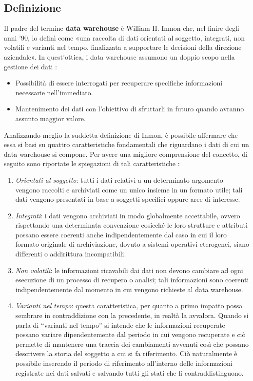 \subsection{Definizione}

Il padre del termine \textbf{data warehouse} è William H. Inmon che, nel finire degli anni '90, lo definì come «una raccolta di dati orientati al soggetto, integrati, non volatili e varianti nel tempo, finalizzata a supportare le decisioni della direzione aziendale». In quest'ottica, i data warehouse assumono un doppio scopo nella gestione dei dati \cite{inmon_building_the_data_warehouse}:

\begin{itemize}
    \item Possibilità di essere interrogati per recuperare specifiche informazioni necessarie nell'immediato.
    \item Mantenimento dei dati con l'obiettivo di sfruttarli in futuro quando avranno assunto maggior valore.
\end{itemize}

Analizzando meglio la suddetta definizione di Inmon, è possibile affermare che essa si basi su quattro caratteristiche fondamentali che riguardano i dati di cui un data warehouse si compone. Per avere una migliore comprensione del concetto, di seguito sono riportate le spiegazioni di tali caratteristiche \cite{researchgate_data_warehouse_architecture}:

\begin{enumerate}
    \item \textit{Orientati al soggetto}: tutti i dati relativi a un determinato argomento vengono raccolti e archiviati come un unico insieme in un formato utile; tali dati vengono presentati in base a soggetti specifici oppure aree di interesse.
    \item \textit{Integrati}: i dati vengono archiviati in modo globalmente accettabile, ovvero rispettando una determinata convenzione cosicché le loro strutture e attributi possano essere coerenti anche indipendentemente dal caso in cui il loro formato originale di archiviazione, dovuto a sistemi operativi eterogenei, siano differenti o addirittura incompatibili.
    \item \textit{Non volatili}: le informazioni ricavabili dai dati non devono cambiare ad ogni esecuzione di un processo di recupero o analisi; tali informazioni sono coerenti indipendentemente dal momento in cui vengono richieste al data warehouse.
    \item \textit{Varianti nel tempo}: questa caratteristica, per quanto a primo impatto possa sembrare in contraddizione con la precedente, in realtà la avvalora. Quando si parla di “varianti nel tempo” si intende che le informazioni recuperate possano variare dipendentemente dal periodo in cui vengono recuperate e ciò permette di mantenere una traccia dei cambiamenti avvenuti così che possano descrivere la storia del soggetto a cui si fa riferimento. Ciò naturalmente è possibile inserendo il periodo di riferimento all'interno delle informazioni registrate nei dati salvati e salvando tutti gli stati che li contraddistinguono.
\end{enumerate}

